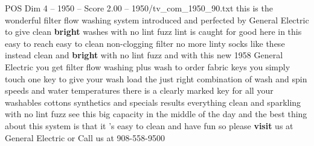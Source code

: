 \begin{textsample}{POS Dim 4 – 1950 – Score 2.00 – 1950/tv\_com\_1950\_90.txt}  \label{ex:f4_pos_088}
this is the wonderful filter flow washing system introduced and perfected by General Electric to give clean \textbf{bright} washes with no lint fuzz lint is caught for good here in this easy to reach easy to clean non-clogging filter no more linty socks like these instead clean and \textbf{bright} with no lint fuzz and with this new 1958 General Electric you get filter flow washing plus wash to order fabric keys you simply touch one key to give your wash load the just right combination of wash and spin speeds and water temperatures there is a clearly marked key for all your washables cottons synthetics and specials results everything clean and sparkling with no lint fuzz see this big capacity in the middle of the day and the best thing about this system is that it 's easy to clean and have fun so please \textbf{visit} us at General Electric or Call us at 908-558-9500

\end{textsample}
